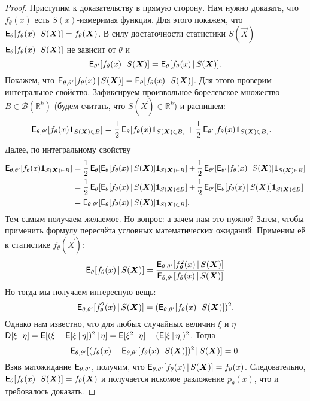 \begin{proof}
	Приступим к доказательству в прямую сторону. Нам нужно доказать, что $f_{\theta}(x)$ есть $S(x)$-измеримая функция. Для этого покажем, что $\operatorname{\mathsf{E}}_{\theta}[f_{\theta}(x)\,|\,S(\bm{X})] = f_{\theta}(\bm{X})$. В силу достаточности статистики $S(\vec{X})$ $\operatorname{\mathsf{E}}_{\theta}[f_{\theta}(x)\,|\,S(\bm{X})]$ не зависит от $\theta$ и
	\[
		\operatorname{\mathsf{E}}_{\theta'}[f_{\theta}(x)\,|\,S(\bm{X})]
		= \operatorname{\mathsf{E}}_{\theta}[f_{\theta}(x)\,|\,S(\bm{X})].
	\]
	Покажем, что $\operatorname{\mathsf{E}}_{\theta, \theta'}[f_{\theta}(x)\,|\,S(\bm{X})] = \operatorname{\mathsf{E}}_{\theta}[f_{\theta}(x)\,|\,S(\bm{X})]$. Для этого проверим интегральное свойство. Зафиксируем произвольное борелевское множество $B \in \mathcal{B}(\mathbb{R}^{k})$ (будем считать, что $S(\vec{X}) \in \mathbb{R}^{k}$) и распишем: 
	\begin{align*}
		\operatorname{\mathsf{E}}_{\theta, \theta'}[f_{\theta}(x)\mathbf{1}_{S(\bm{X}) \in B}]
		&= \frac{1}{2}\operatorname{\mathsf{E}}_{\theta}[f_{\theta}(x)\mathbf{1}_{S(\bm{X}) \in B}] + \frac{1}{2}\operatorname{\mathsf{E}}_{\theta'}[f_{\theta}(x)\mathbf{1}_{S(\bm{X}) \in B}].
	\end{align*}
	Далее, по интегральному свойству
	\begin{align*}
		\operatorname{\mathsf{E}}_{\theta, \theta'}[f_{\theta}(x)\mathbf{1}_{S(\bm{X}) \in B}]
		&= \frac{1}{2}\operatorname{\mathsf{E}}_{\theta}[\operatorname{\mathsf{E}}_{\theta}[f_{\theta}(x)\,|\,S(\bm{X})]\mathbf{1}_{S(\bm{X}) \in B}] + \frac{1}{2}\operatorname{\mathsf{E}}_{\theta'}[\operatorname{\mathsf{E}}_{\theta'}[f_{\theta}(x)\,|\,S(\bm{X})]\mathbf{1}_{S(\bm{X}) \in B}] \\
		&= \frac{1}{2}\operatorname{\mathsf{E}}_{\theta}[\operatorname{\mathsf{E}}_{\theta}[f_{\theta}(x)\,|\,S(\bm{X})]\mathbf{1}_{S(\bm{X}) \in B}] + \frac{1}{2}\operatorname{\mathsf{E}}_{\theta'}[\operatorname{\mathsf{E}}_{\theta}[f_{\theta}(x)\,|\,S(\bm{X})]\mathbf{1}_{S(\bm{X}) \in B}] \\
		&= \operatorname{\mathsf{E}}_{\theta, \theta'}[\operatorname{\mathsf{E}}_{\theta}[f_{\theta}(x)\,|\,S(\bm{X})]\mathbf{1}_{S(\bm{X}) \in B}].
	\end{align*}
	Тем самым получаем желаемое. Но вопрос: а зачем нам это нужно? Затем, чтобы применить формулу пересчёта условных математических ожиданий. Применим её к статистике $f_{\theta}(\vec{X})$:
	\[
		\operatorname{\mathsf{E}}_{\theta}[f_{\theta}(x)\,|\,S(\bm{X})]
		= \frac{\operatorname{\mathsf{E}}_{\theta, \theta'}[f_{\theta}^{2}(x)\,|\,S(\bm{X})]}{\operatorname{\mathsf{E}}_{\theta, \theta'}[f_{\theta}(x)\,|\,S(\bm{X})]}
	\]
	Но тогда мы получаем интересную вещь:
	\[
		\operatorname{\mathsf{E}}_{\theta, \theta'}[f_{\theta}^{2}(x)\,|\,S(\bm{X})]
		= (\operatorname{\mathsf{E}}_{\theta, \theta'}[f_{\theta}(x)\,|\,S(\bm{X})])^{2}.
	\]
	Однако нам известно, что для любых случайных величин $\xi$ и $\eta$ $\operatorname{\mathsf{D}}[\xi\,|\,\eta] = \operatorname{\mathsf{E}}[(\xi - \operatorname{\mathsf{E}}[\xi\,|\,\eta])^{2}\,|\,\eta] = \operatorname{\mathsf{E}}[\xi^{2}\,|\,\eta] - (\operatorname{\mathsf{E}}[\xi\,|\,\eta])^{2}$. Тогда
	\[
		\operatorname{\mathsf{E}}_{\theta, \theta'}[(f_{\theta}(x) - \operatorname{\mathsf{E}}_{\theta, \theta'}[f_{\theta}(x)\,|\,S(\bm{X})])^{2}\,|\,S(\bm{X})] = 0.
	\]
	Взяв матожидание $\operatorname{\mathsf{E}}_{\theta, \theta'}$, получим, что $\operatorname{\mathsf{E}}_{\theta, \theta'}[f_{\theta}(x)\,|\,S(\bm{X})] = f_{\theta}(x)$. Следовательно, $\operatorname{\mathsf{E}}_{\theta}[f_{\theta}(x)\,|\,S(\bm{X})] = f_{\theta}(\bm{X})$ и получается искомое разложение $p_{\theta}(x)$, что и требовалось доказать.
\end{proof}

